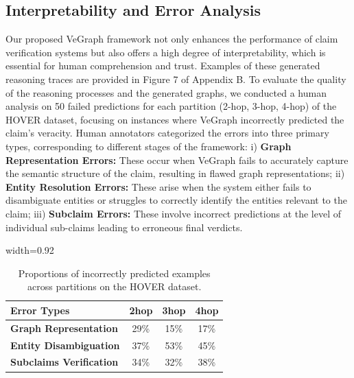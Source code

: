 \documentclass[11pt]{article}
\begin{document}
\subsection{Interpretability and Error Analysis}
Our proposed VeGraph framework not only enhances the performance of claim verification systems but also offers a high degree of interpretability, which is essential for human comprehension and trust. Examples of these generated reasoning traces are provided in Figure 7 of Appendix B. To evaluate the quality of the reasoning processes and the generated graphs, we conducted a human analysis on 50 failed predictions for each partition (2-hop, 3-hop, 4-hop) of the HOVER dataset, focusing on instances where VeGraph incorrectly predicted the claim's veracity. Human annotators categorized the errors into three primary types, corresponding to different stages of the framework: i) \textbf{Graph Representation Errors:} These occur when VeGraph fails to accurately capture the semantic structure of the claim, resulting in flawed graph representations; ii) \textbf{Entity Resolution Errors:} These arise when the system either fails to disambiguate entities or struggles to correctly identify the entities relevant to the claim; iii) \textbf{Subclaim Errors:} These involve incorrect predictions at the level of individual sub-claims leading to erroneous final verdicts.
\begin{table}[!h]
\centering
\begin{adjustbox}{width=0.92\columnwidth}
\begin{tabular}{l|ccc}
\hline\hline
\textbf{Error Types} & \textbf{2hop} & \textbf{3hop} & \textbf{4hop} \\
\hline
\textbf{Graph Representation}  & 29\% & 15\% & 17\% \\
\textbf{Entity Disambiguation}  & 37\% & 53\% & 45\% \\
\textbf{Subclaims Verification} & 34\% & 32\% & 38\% \\
\hline\hline
\end{tabular}
\end{adjustbox}
\caption{Proportions of incorrectly predicted examples across partitions on the HOVER dataset.}
\label{tab:error_analysis}
\end{table}
\\
\end{document}

